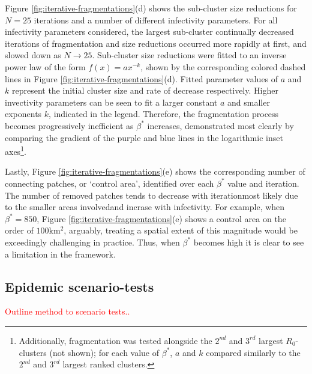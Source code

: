 Figure \ref{fig:iterative-fragmentations}(d) shows the sub-cluster size reductions for $N=25$ iterations and a number of different infectivity parameters.
For all infectivity parameters considered, the largest sub-cluster continually decreased iterations of fragmentation and size reductions occurred more rapidly at first, and slowed down as $N\rightarrow 25$.
Sub-cluster size reductions were fitted to an inverse power law of the form $f(x) = ax^{-k}$, shown by the corresponding colored dashed lines in Figure \ref{fig:iterative-fragmentations}(d).
Fitted parameter values of $a$ and $k$ represent the initial cluster size and rate of decrease respectively. 
Higher invectivity parameters can be seen to fit a larger constant $a$ and smaller exponents $k$, indicated in the legend.
Therefore, the fragmentation process becomes progressively inefficient as $\beta^*$ increases,
demonstrated most clearly by comparing the gradient of the purple and blue lines in the logarithmic inset axes\footnote{
Additionally, fragmentation was tested alongside the $2^{nd}$ and $3^{rd}$ largest $R_0$-clusters (not shown); 
for each value of $\beta^*$, $a$ and $k$ compared similarly to the $2^{nd}$ and $3^{rd}$ largest ranked clusters.}.

Lastly, Figure \ref{fig:iterative-fragmentations}(e) shows the corresponding number of connecting patches, or `control area', identified over each $\beta^*$ value and iteration.
The number of removed patches tends to decrease with iteration\textemdash most likely due to the smaller areas involved\textemdash and incrase with infectivity.
For example, when $\beta^*=850$, Figure \ref{fig:iterative-fragmentations}(e) shows a control area on the order of $100\mathrm{km^2}$,
arguably, treating a spatial extent of this magnitude would be exceedingly challenging in practice.
Thus, when $\beta^*$ becomes high it is clear to see a limitation in the framework.


\subsection{Epidemic scenario-tests}

\textcolor{red}{Outline method to scenario tests..}
\blindtext

